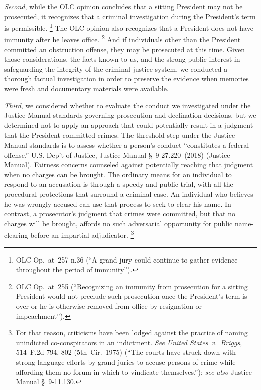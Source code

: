\textit{Second}, while the OLC opinion concludes that a sitting President may not be prosecuted, it recognizes that a criminal investigation during the President's term is permissible.%
\footnote{OLC Op.\ at~257 n.36 (``A grand jury could continue to gather evidence throughout the period of immunity'').}
The OLC opinion also recognizes that a President does not have immunity after he leaves office.%
\footnote{OLC Op.\ at~255 (``Recognizing an immunity from prosecution for a sitting President would not preclude such prosecution once the President's term is over or he is otherwise removed from office by resignation or impeachment'').}
And if individuals other than the President committed an obstruction offense, they may be prosecuted at this time.
Given those considerations, the facts known to us, and the strong public interest in safeguarding the integrity of the criminal justice system, we conducted a thorough factual investigation in order to preserve the evidence when memories were fresh and documentary materials were available.

\textit{Third}, we considered whether to evaluate the conduct we investigated under the Justice Manual standards governing prosecution and declination decisions, but we determined not to apply an approach that could potentially result in a judgment that the President committed crimes.
The threshold step under the Justice Manual standards is to assess whether a person's conduct
``constitutes a federal offense.''
U.S. Dep't of Justice, Justice Manual \S~9-27.220~(2018) (Justice Manual).
Fairness concerns counseled against potentially reaching that judgment when no charges can be brought.
The ordinary means for an individual to respond to an accusation is through a speedy and public trial, with all the procedural protections that surround a criminal case.
An individual who believes he was wrongly accused can use that process to seek to clear his name.
In contrast, a prosecutor's judgment that crimes were committed, but that no charges will be brought, affords no such adversarial opportunity for public name-clearing before an impartial adjudicator.%
\footnote{For that reason, criticisms have been lodged against the practice of naming unindicted co-conspirators in an indictment.
\textit{See United States~v.\ Briggs}, 514~F.2d 794, 802 (5th~Cir.~1975) (``The courts have struck down with strong language efforts by grand juries to accuse persons of crime while affording them no forum in which to vindicate themselves.'');
\textit{see also} Justice Manual \S~9-11.130.}

